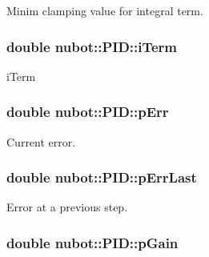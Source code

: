 Minim clamping value for integral term. 

\hypertarget{group__gazebo__common_gad05e98c72f5396f4bd32e729ede59ad1}{
\subsubsection[{i\-Term}]{\setlength{\rightskip}{0pt plus 5cm}double nubot\-::\-P\-I\-D\-::i\-Term\hspace{0.3cm}{\ttfamily [private]}}}\label{group__gazebo__common_gad05e98c72f5396f4bd32e729ede59ad1}


i\-Term 

\hypertarget{group__gazebo__common_ga3b4084ff47368c23428b95c2fa6d78ee}{
\subsubsection[{p\-Err}]{\setlength{\rightskip}{0pt plus 5cm}double nubot\-::\-P\-I\-D\-::p\-Err\hspace{0.3cm}{\ttfamily [private]}}}\label{group__gazebo__common_ga3b4084ff47368c23428b95c2fa6d78ee}


Current error. 

\hypertarget{group__gazebo__common_gab22052153953c1a8b5eee63ab415fa2a}{
\subsubsection[{p\-Err\-Last}]{\setlength{\rightskip}{0pt plus 5cm}double nubot\-::\-P\-I\-D\-::p\-Err\-Last\hspace{0.3cm}{\ttfamily [private]}}}\label{group__gazebo__common_gab22052153953c1a8b5eee63ab415fa2a}


Error at a previous step. 

\hypertarget{group__gazebo__common_ga515d0b570daa43350349e1b776860a58}{
\subsubsection[{p\-Gain}]{\setlength{\rightskip}{0pt plus 5cm}double nubot\-::\-P\-I\-D\-::p\-Gain\hspace{0.3cm}{\ttfamily [private]}}}\label{group__gazebo__common_ga515d0b570daa43350349e1b776860a58}


